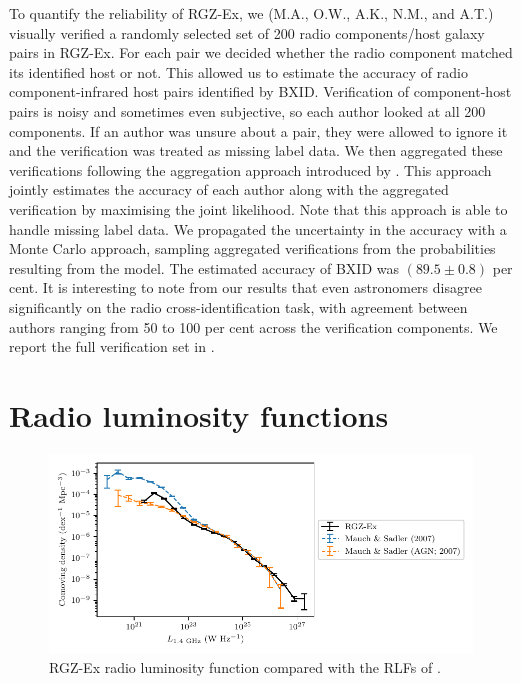     To quantify the reliability of RGZ-Ex, we (M.A., O.W., A.K., N.M., and A.T.) visually verified a randomly selected set of 200 radio components/host galaxy pairs in RGZ-Ex. For each pair we decided whether the radio component matched its identified host or not. This allowed us to estimate the accuracy of radio component-infrared host pairs identified by BXID. Verification of component-host pairs is noisy and sometimes even subjective, so each author looked at all 200 components. If an author was unsure about a pair, they were allowed to ignore it and the verification was treated as missing label data. We then aggregated these verifications following the aggregation approach introduced by \citet{dawid79em}. This approach jointly estimates the accuracy of each author along with the aggregated verification by maximising the joint likelihood. Note that this approach is able to handle missing label data. We propagated the uncertainty in the accuracy with a Monte Carlo approach, sampling aggregated verifications from the probabilities resulting from the \citeauthor{dawid79em} model. The estimated accuracy of BXID was $(89.5 \pm 0.8)$ per cent. It is interesting to note from our results that even astronomers disagree significantly on the radio cross-identification task, with agreement between authors ranging from 50 to 100 per cent across the verification components. We report the full verification set in .

\section{Radio luminosity functions}
\label{sec:rlfs-rlf}

  \begin{figure}
      \centering
    \includegraphics{rlf-images/rlf.pdf}
    \caption{RGZ-Ex radio luminosity function compared with the RLFs of \citet{mauch07rlf}.
      \label{fig:rlf}}
  \end{figure}


